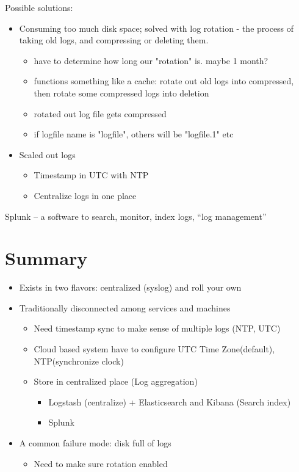 \documentclass[fancy,11pt,titlestyle=display]{style/elegantbook}
\begin{document}
\noindent Possible solutions:
\begin{itemize}
    \item Consuming too much disk space; solved with log rotation - the process of taking old logs, and compressing or deleting them. 
    \begin{itemize}
        \item have to determine how long our "rotation" is. maybe 1 month?
        \item functions something like a cache: rotate out old logs into compressed, then rotate some compressed logs into deletion
        \item rotated out log file gets compressed
        \item if logfile name is "logfile", others will be "logfile.1" etc
    \end{itemize}
    \item Scaled out logs
    \begin{itemize}
        \item Timestamp in UTC with NTP
        \item Centralize logs in one place
    \end{itemize}
\end{itemize}
Splunk – a software to search, monitor, index logs, “log management”




\section{Summary}
\begin{itemize}
    \item Exists in two flavors: centralized (syslog) and roll your own
    \item Traditionally disconnected among services and machines
    \begin{itemize}
        \item Need timestamp sync to make sense of multiple logs (NTP, UTC)\item Cloud based system have to configure UTC Time Zone(default), NTP(synchronize clock)
        \item Store in centralized place (Log aggregation)
        \begin{itemize}
            \item Logstash (centralize) + Elasticsearch and Kibana (Search index)
            \item Splunk
        \end{itemize}
    \end{itemize}
    \item A common failure mode: disk full of logs
    \begin{itemize}
        \item Need to make sure rotation enabled
    \end{itemize}
\end{itemize}
\end{document}
